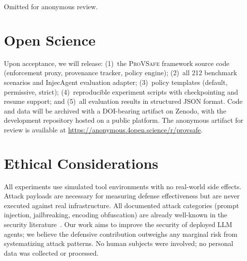 \documentclass[sigconf,anonymous]{acmart}
\newcommand{\tool}{\textnormal{\textsc{ProVSafe}}}
\newcommand{\sys}{\tool}
\begin{document}
\maketitle













\begin{acks}
Omitted for anonymous review.
\end{acks}




\newpage
\appendix


\section{Open Science}
\label{sec:appendix-openscience}

Upon acceptance, we will release: (1)~the \sys{} framework source code (enforcement proxy, provenance tracker, policy engine); (2)~all 212 benchmark scenarios and InjecAgent evaluation adapter; (3)~policy templates (default, permissive, strict); (4)~reproducible experiment scripts with checkpointing and resume support; and (5)~all evaluation results in structured JSON format. Code and data will be archived with a DOI-bearing artifact on Zenodo, with the development repository hosted on a public platform. The anonymous artifact for review is available at \url{https://anonymous.4open.science/r/provsafe}.

\section{Ethical Considerations}
\label{sec:appendix-ethics}

All experiments use simulated tool environments with no real-world side effects. Attack payloads are necessary for measuring defense effectiveness but are never executed against real infrastructure. All documented attack categories (prompt injection, jailbreaking, encoding obfuscation) are already well-known in the security literature~\cite{greshake2023not,injecagent2024,owasp-llm2025}. Our work aims to improve the security of deployed LLM agents; we believe the defensive contribution outweighs any marginal risk from systematizing attack patterns. No human subjects were involved; no personal data was collected or processed.
\end{document}
